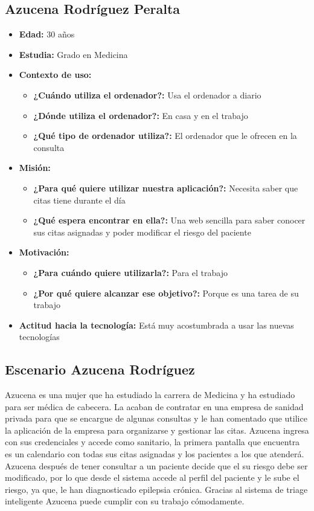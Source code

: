 \subsection{Azucena Rodríguez Peralta}
\begin{itemize}
    \item \textbf{Edad: } 30 años
    \item \textbf{Estudia: } Grado en Medicina
    \item \textbf{Contexto de uso: } 
    \begin{itemize}
        \item \textbf{¿Cuándo utiliza el ordenador?: }  Usa el ordenador a diario
        \item \textbf{¿Dónde utiliza el ordenador?: } En casa y en el trabajo 
        \item \textbf{¿Qué tipo de ordenador utiliza?: } El ordenador que le ofrecen en la consulta
    \end{itemize}
    \item \textbf{Misión: } 
    \begin{itemize}
        \item \textbf{¿Para qué quiere utilizar nuestra aplicación?: } Necesita saber que citas tiene durante el día
        \item \textbf{¿Qué espera encontrar en ella?: } Una web sencilla para saber conocer sus citas asignadas y poder modificar el riesgo del paciente
    \end{itemize}
    \item \textbf{Motivación: } 
    \begin{itemize}
        \item \textbf{¿Para cuándo quiere utilizarla?: } Para el trabajo 
        \item \textbf{¿Por qué quiere alcanzar ese objetivo?: } Porque es una tarea de su trabajo
    \end{itemize}
    \item \textbf{Actitud hacia la tecnología: } Está muy acostumbrada a usar las nuevas tecnologías
\end{itemize}

\subsection{Escenario Azucena Rodríguez}
    Azucena es una mujer que ha estudiado la carrera de Medicina y ha estudiado para ser médica de cabecera. 
    La acaban de contratar en una empresa de sanidad privada para que se encargue de algunas consultas y le
    han comentado que utilice la aplicación de la empresa para organizarse y gestionar las citas. 
    Azucena ingresa con sus credenciales y accede como sanitario, la primera pantalla que encuentra 
    es un calendario con todas sus citas asignadas y los pacientes a los que atenderá.
    Azucena después de tener consultar a un paciente decide que el su riesgo debe ser modificado, por lo que 
    desde el sistema accede al perfil del paciente y le sube el riesgo, ya que, le han diagnosticado epilepsia
    crónica. Gracias al sistema de triage inteligente Azucena puede cumplir con su trabajo cómodamente.